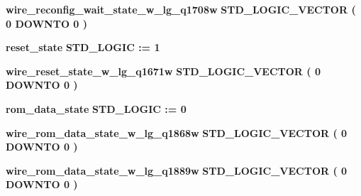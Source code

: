 \begin{DoxyCompactItemize}
{\bf wire\+\_\+reconfig\+\_\+wait\+\_\+state\+\_\+w\+\_\+lg\+\_\+q1708w} {\bfseries \textcolor{comment}{S\+T\+D\+\_\+\+L\+O\+G\+I\+C\+\_\+\+V\+E\+C\+T\+OR}\textcolor{vhdlchar}{ }\textcolor{vhdlchar}{(}\textcolor{vhdlchar}{ }\textcolor{vhdlchar}{ } \textcolor{vhdldigit}{0} \textcolor{vhdlchar}{ }\textcolor{keywordflow}{D\+O\+W\+N\+TO}\textcolor{vhdlchar}{ }\textcolor{vhdlchar}{ } \textcolor{vhdldigit}{0} \textcolor{vhdlchar}{ }\textcolor{vhdlchar}{)}\textcolor{vhdlchar}{ }} 
\item 
{\bf reset\+\_\+state} {\bfseries \textcolor{comment}{S\+T\+D\+\_\+\+L\+O\+G\+IC}\textcolor{vhdlchar}{ }\textcolor{vhdlchar}{ }\textcolor{vhdlchar}{\+:}\textcolor{vhdlchar}{=}\textcolor{vhdlchar}{ }\textcolor{vhdlchar}{ }\textcolor{vhdlchar}{\textquotesingle{}}\textcolor{vhdlchar}{ } \textcolor{vhdldigit}{1} \textcolor{vhdlchar}{ }\textcolor{vhdlchar}{\textquotesingle{}}\textcolor{vhdlchar}{ }} 
\item 
{\bf wire\+\_\+reset\+\_\+state\+\_\+w\+\_\+lg\+\_\+q1671w} {\bfseries \textcolor{comment}{S\+T\+D\+\_\+\+L\+O\+G\+I\+C\+\_\+\+V\+E\+C\+T\+OR}\textcolor{vhdlchar}{ }\textcolor{vhdlchar}{(}\textcolor{vhdlchar}{ }\textcolor{vhdlchar}{ } \textcolor{vhdldigit}{0} \textcolor{vhdlchar}{ }\textcolor{keywordflow}{D\+O\+W\+N\+TO}\textcolor{vhdlchar}{ }\textcolor{vhdlchar}{ } \textcolor{vhdldigit}{0} \textcolor{vhdlchar}{ }\textcolor{vhdlchar}{)}\textcolor{vhdlchar}{ }} 
\item 
{\bf rom\+\_\+data\+\_\+state} {\bfseries \textcolor{comment}{S\+T\+D\+\_\+\+L\+O\+G\+IC}\textcolor{vhdlchar}{ }\textcolor{vhdlchar}{ }\textcolor{vhdlchar}{\+:}\textcolor{vhdlchar}{=}\textcolor{vhdlchar}{ }\textcolor{vhdlchar}{ }\textcolor{vhdlchar}{\textquotesingle{}}\textcolor{vhdlchar}{ } \textcolor{vhdldigit}{0} \textcolor{vhdlchar}{ }\textcolor{vhdlchar}{\textquotesingle{}}\textcolor{vhdlchar}{ }} 
\item 
{\bf wire\+\_\+rom\+\_\+data\+\_\+state\+\_\+w\+\_\+lg\+\_\+q1868w} {\bfseries \textcolor{comment}{S\+T\+D\+\_\+\+L\+O\+G\+I\+C\+\_\+\+V\+E\+C\+T\+OR}\textcolor{vhdlchar}{ }\textcolor{vhdlchar}{(}\textcolor{vhdlchar}{ }\textcolor{vhdlchar}{ } \textcolor{vhdldigit}{0} \textcolor{vhdlchar}{ }\textcolor{keywordflow}{D\+O\+W\+N\+TO}\textcolor{vhdlchar}{ }\textcolor{vhdlchar}{ } \textcolor{vhdldigit}{0} \textcolor{vhdlchar}{ }\textcolor{vhdlchar}{)}\textcolor{vhdlchar}{ }} 
\item 
{\bf wire\+\_\+rom\+\_\+data\+\_\+state\+\_\+w\+\_\+lg\+\_\+q1889w} {\bfseries \textcolor{comment}{S\+T\+D\+\_\+\+L\+O\+G\+I\+C\+\_\+\+V\+E\+C\+T\+OR}\textcolor{vhdlchar}{ }\textcolor{vhdlchar}{(}\textcolor{vhdlchar}{ }\textcolor{vhdlchar}{ } \textcolor{vhdldigit}{0} \textcolor{vhdlchar}{ }\textcolor{keywordflow}{D\+O\+W\+N\+TO}\textcolor{vhdlchar}{ }\textcolor{vhdlchar}{ } \textcolor{vhdldigit}{0} \textcolor{vhdlchar}{ }\textcolor{vhdlchar}{)}\textcolor{vhdlchar}{ }} 

\end{DoxyCompactItemize}
